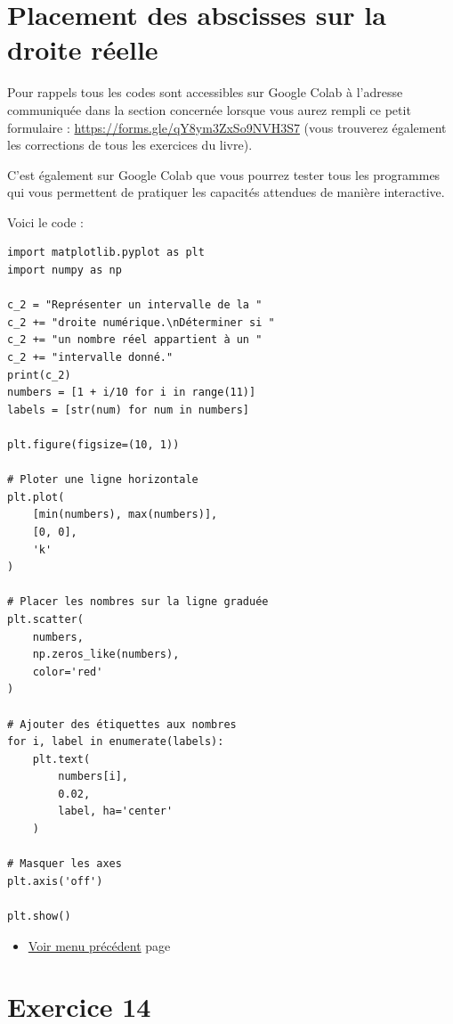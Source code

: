 \documentclass[a4paper,11pt]{book}
\begin{document}
\clearpage

\section{Placement des abscisses sur la droite réelle}
\label{sec:org4293055}
\label{org873e05f}
\label{page:sec3.3.1x-axis}

Pour rappels tous les codes sont accessibles sur Google Colab à
l'adresse communiquée dans la section concernée lorsque vous
aurez rempli ce petit formulaire : \url{https://forms.gle/qY8ym3ZxSo9NVH3S7}
(vous trouverez également les corrections de tous les exercices du
livre).

C'est également sur Google Colab que vous pourrez tester tous les
programmes qui vous permettent de pratiquer les capacités attendues
de manière interactive.

\clearpage

Voici le code :

\begin{verbatim}
import matplotlib.pyplot as plt
import numpy as np

c_2 = "Représenter un intervalle de la "
c_2 += "droite numérique.\nDéterminer si " 
c_2 += "un nombre réel appartient à un "
c_2 += "intervalle donné."
print(c_2)
numbers = [1 + i/10 for i in range(11)]
labels = [str(num) for num in numbers]

plt.figure(figsize=(10, 1))

# Ploter une ligne horizontale
plt.plot(
    [min(numbers), max(numbers)],
    [0, 0],
    'k'
)

# Placer les nombres sur la ligne graduée
plt.scatter(
    numbers,
    np.zeros_like(numbers),
    color='red'
)

# Ajouter des étiquettes aux nombres
for i, label in enumerate(labels):
    plt.text(
        numbers[i],
        0.02,
        label, ha='center'
    )

# Masquer les axes
plt.axis('off')

plt.show()
\end{verbatim}

\begin{itemize}
\item \hyperref[org449ea02]{Voir menu précédent}
page~\pageref{page:capacity2-menu}
\end{itemize}

\clearpage

\section{Exercice 14}
\label{sec:org676b878}
\label{org7d5ffab}
\label{page:sec3.3.2exo14}
\end{document}
